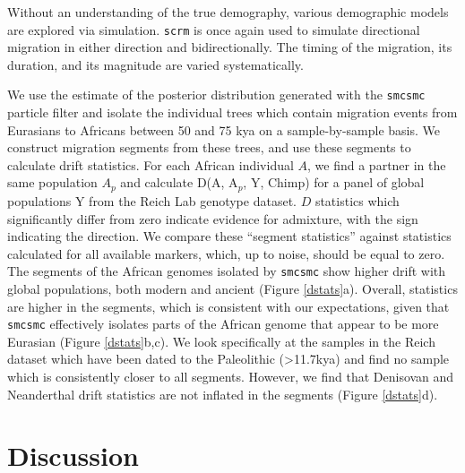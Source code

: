 \documentclass{article}
\begin{document}
Without an understanding of the true demography, various demographic models are explored via simulation. {\tt scrm} is once again used to simulate directional migration in either direction and bidirectionally. The timing of the migration, its duration, and its magnitude are varied systematically. 
 
We use the estimate of the posterior distribution generated with the {\tt smcsmc} particle filter and isolate the individual trees which contain migration events from Eurasians to Africans between 50 and 75 kya on a sample-by-sample basis. We construct migration segments from these trees, and use these segments to calculate drift statistics. For each African individual $A$, we find a partner in the same population $A_p$ and calculate D(A, A$_p$, Y, Chimp) for a panel of global populations Y from the Reich Lab genotype dataset. $D$ statistics which significantly differ from zero indicate evidence for admixture, with the sign indicating the direction. We compare these ``segment statistics'' against statistics calculated for all available markers, which, up to noise, should be equal to zero. The segments of the African genomes isolated by {\tt smcsmc} show higher drift with global populations, both modern and ancient (Figure \ref{dstats}a). Overall, statistics are higher in the segments, which is consistent with our expectations, given that {\tt smcsmc} effectively isolates parts of the African genome that appear to be more Eurasian (Figure \ref{dstats}b,c). We look specifically at the samples in the Reich dataset which have been dated to the Paleolithic (>11.7kya) and find no sample which is consistently closer to all segments. However, we find that Denisovan and Neanderthal drift statistics are not inflated in the segments (Figure \ref{dstats}d). 


\section{Discussion}
\end{document}
